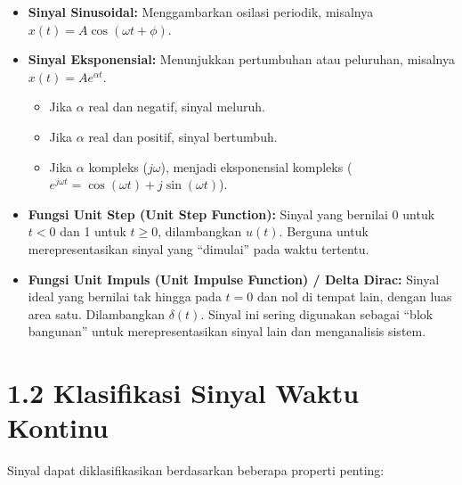\documentclass[
  letterpaper,
  DIV=11,
  numbers=noendperiod]{scrreprt}
\providecommand{\tightlist}{%
  \setlength{\itemsep}{0pt}\setlength{\parskip}{0pt}}
\begin{document}
\begin{itemize}
\tightlist
\item
  \textbf{Sinyal Sinusoidal:} Menggambarkan osilasi periodik, misalnya
  \(x(t) = A \cos(\omega t + \phi)\).
\item
  \textbf{Sinyal Eksponensial:} Menunjukkan pertumbuhan atau peluruhan,
  misalnya \(x(t) = A e^{\alpha t}\).

  \begin{itemize}
  \tightlist
  \item
    Jika \(\alpha\) real dan negatif, sinyal meluruh.
  \item
    Jika \(\alpha\) real dan positif, sinyal bertumbuh.
  \item
    Jika \(\alpha\) kompleks (\(j\omega\)), menjadi eksponensial
    kompleks (\(e^{j\omega t} = \cos(\omega t) + j\sin(\omega t)\)).
  \end{itemize}
\item
  \textbf{Fungsi Unit Step (Unit Step Function):} Sinyal yang bernilai 0
  untuk \(t<0\) dan 1 untuk \(t \ge 0\), dilambangkan \(u(t)\). Berguna
  untuk merepresentasikan sinyal yang ``dimulai'' pada waktu tertentu.
\item
  \textbf{Fungsi Unit Impuls (Unit Impulse Function) / Delta Dirac:}
  Sinyal ideal yang bernilai tak hingga pada \(t=0\) dan nol di tempat
  lain, dengan luas area satu. Dilambangkan \(\delta(t)\). Sinyal ini
  sering digunakan sebagai ``blok bangunan'' untuk merepresentasikan
  sinyal lain dan menganalisis sistem.
\end{itemize}

\section{1.2 Klasifikasi Sinyal Waktu
Kontinu}\label{klasifikasi-sinyal-waktu-kontinu}

Sinyal dapat diklasifikasikan berdasarkan beberapa properti penting:
\end{document}

